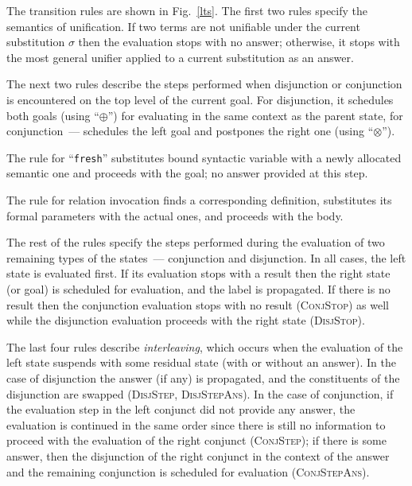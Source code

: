 The transition rules are shown in Fig.~\ref{lts}. The first two rules specify the semantics of unification. If two terms are not unifiable under the current substitution
$\sigma$ then the evaluation stops with no answer; otherwise, it stops with the most general unifier applied to a current substitution as an answer.

The next two rules describe the steps performed when disjunction or conjunction is encountered on the top level of the current goal. For disjunction, it schedules both goals (using ``$\oplus$'') for
evaluating in the same context as the parent state, for conjunction~--- schedules the left goal and postpones the right one (using ``$\otimes$'').

The rule for ``\lstinline|fresh|'' substitutes bound syntactic variable with a newly allocated semantic one and proceeds with the goal; no answer provided at this step.

The rule for relation invocation finds a corresponding definition, substitutes its formal parameters with the actual ones, and proceeds with the body.

The rest of the rules specify the steps performed during the evaluation of two remaining types of the states~--- conjunction and disjunction. In all cases, the left state
is evaluated first. If its evaluation stops with a result then the right state (or goal) is scheduled for evaluation, and the label is propagated. If there is no result then
the conjunction evaluation stops with no result (\textsc{ConjStop}) as well while the disjunction evaluation proceeds with the right state (\textsc{DisjStop}).

The last four rules describe \emph{interleaving}, which occurs when the evaluation of the left state suspends with some residual state (with or without an answer). In the case of disjunction
the answer (if any) is propagated, and the constituents of the disjunction are swapped (\textsc{DisjStep}, \textsc{DisjStepAns}). In the case of conjunction, if the evaluation step in
the left conjunct did not provide any answer, the evaluation is continued in the same order since there is still no information to proceed with the evaluation of the right
conjunct (\textsc{ConjStep}); if there is some answer, then the disjunction of the right conjunct in the context of the answer and the remaining conjunction is
scheduled for evaluation (\textsc{ConjStepAns}).

